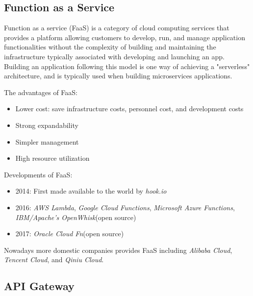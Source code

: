 \documentclass[a4paper,12pt]{article}
\begin{document}
\subsection{Function as a Service}
Function as a service (FaaS) is a category of cloud computing services that provides a platform allowing customers to develop, run, and manage application functionalities without the complexity of building and maintaining the infrastructure typically associated with developing and launching an app. Building an application following this model is one way of achieving a "serverless" architecture, and is typically used when building microservices applications\cite{faas}. 

The advantages of FaaS:
\begin{itemize}
	\item Lower cost: save infrastructure costs, personnel cost, and development costs
	\item Strong expandability
	\item Simpler management
	\item High resource utilization
\end{itemize}

Developments of FaaS:
\begin{itemize}
	\item 2014: First made available to the world by \textsl{hook.io}
	\item 2016: \textsl{AWS Lambda}, \textsl{Google Cloud Functions}, \textsl{Microsoft Azure Functions}, \textsl{IBM/Apache's OpenWhisk}(open source)
	\item 2017: \textsl{Oracle Cloud Fn}(open source)
\end{itemize}

Nowadays more domestic companies provides FaaS including \textsl{Alibaba Cloud}, \textsl{Tencent Cloud}, and \textsl{Qiniu Cloud}.

\subsection{API Gateway}
\end{document}
